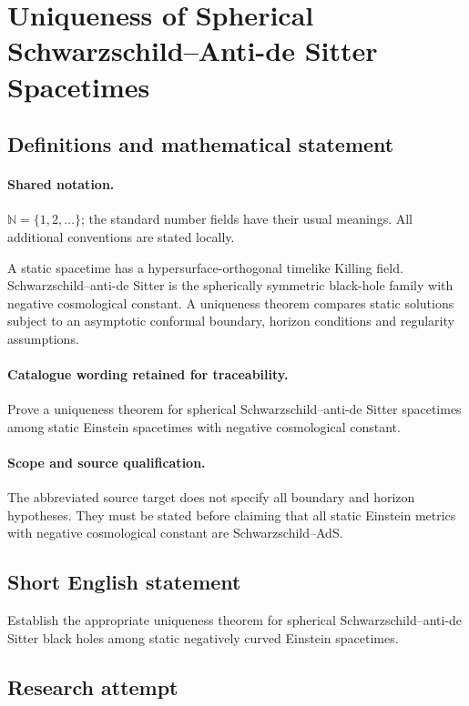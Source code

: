 \documentclass[11pt]{article}
\begin{document}
\section{Uniqueness of Spherical Schwarzschild–Anti-de Sitter Spacetimes}\label{statement}

\subsection{Definitions and mathematical statement}

\paragraph{Shared notation.}$\mathbb N=\{1,2,\ldots\}$; the standard number fields have their usual meanings. All additional conventions are stated locally.


A static spacetime has a hypersurface-orthogonal timelike Killing field. Schwarzschild--anti-de Sitter is the spherically symmetric black-hole family with negative cosmological constant. A uniqueness theorem compares static solutions subject to an asymptotic conformal boundary, horizon conditions and regularity assumptions.

\paragraph{Catalogue wording retained for traceability.}
Prove a uniqueness theorem for spherical Schwarzschild–anti-de Sitter spacetimes among static Einstein spacetimes with negative cosmological constant.

\paragraph{Scope and source qualification.}The abbreviated source target does not specify all boundary and horizon hypotheses. They must be stated before claiming that all static Einstein metrics with negative cosmological constant are Schwarzschild--AdS.
\subsection{Short English statement}
Establish the appropriate uniqueness theorem for spherical Schwarzschild--anti-de Sitter black holes among static negatively curved Einstein spacetimes.
\subsection{Research attempt}
\end{document}

